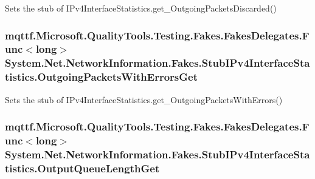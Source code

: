 Sets the stub of I\-Pv4\-Interface\-Statistics.\-get\-\_\-\-Outgoing\-Packets\-Discarded()

\hypertarget{class_system_1_1_net_1_1_network_information_1_1_fakes_1_1_stub_i_pv4_interface_statistics_ac6569fe8088b9faeed0ff6967b888e7c}{
\subsubsection[{Outgoing\-Packets\-With\-Errors\-Get}]{\setlength{\rightskip}{0pt plus 5cm}mqttf.\-Microsoft.\-Quality\-Tools.\-Testing.\-Fakes.\-Fakes\-Delegates.\-Func$<$long$>$ System.\-Net.\-Network\-Information.\-Fakes.\-Stub\-I\-Pv4\-Interface\-Statistics.\-Outgoing\-Packets\-With\-Errors\-Get}}\label{class_system_1_1_net_1_1_network_information_1_1_fakes_1_1_stub_i_pv4_interface_statistics_ac6569fe8088b9faeed0ff6967b888e7c}


Sets the stub of I\-Pv4\-Interface\-Statistics.\-get\-\_\-\-Outgoing\-Packets\-With\-Errors()

\hypertarget{class_system_1_1_net_1_1_network_information_1_1_fakes_1_1_stub_i_pv4_interface_statistics_a8457157b8a7f7ed309db931c47408df6}{
\subsubsection[{Output\-Queue\-Length\-Get}]{\setlength{\rightskip}{0pt plus 5cm}mqttf.\-Microsoft.\-Quality\-Tools.\-Testing.\-Fakes.\-Fakes\-Delegates.\-Func$<$long$>$ System.\-Net.\-Network\-Information.\-Fakes.\-Stub\-I\-Pv4\-Interface\-Statistics.\-Output\-Queue\-Length\-Get}}\label{class_system_1_1_net_1_1_network_information_1_1_fakes_1_1_stub_i_pv4_interface_statistics_a8457157b8a7f7ed309db931c47408df6}


